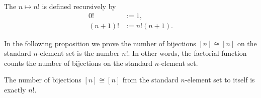 \begin{definition}
  The  $n\mapsto n!$ is defined recursively by
  \begin{align*}
    0! & := 1, \\
    (n+1)! & := n!(n+1).
  \end{align*}  
\end{definition}

In the following proposition we prove the number of bijections $[n]\cong[n]$ on the standard $n$-element set is the number $n!$. In other words, the factorial function counts the number of bijections on the standard $n$-element set.
  
\begin{proposition}
  The number of bijections $[n]\cong [n]$ from the standard $n$-element set to itself is exactly $n!$.
\end{proposition}

